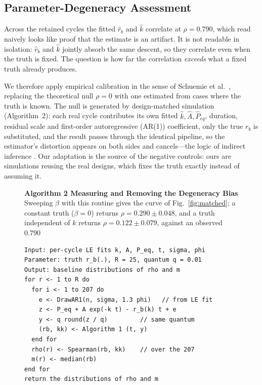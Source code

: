 \documentclass[sigconf]{acmart}
\newcommand{\rb}{\ensuremath{r_{b}}}
\newcommand{\rbh}{\ensuremath{\hat{r}_{b}}}
\newcommand{\kh}{\ensuremath{\hat{k}}}
\begin{document}
\subsection{Parameter-Degeneracy Assessment}

Across the retained cycles the fitted \rbh{} and \kh{} correlate at
$\rho=0.790$, which read naively looks like proof that the estimate is
an artifact. It is not readable in isolation: \rbh{} and \kh{} jointly
absorb the same descent, so they correlate even when the truth is
fixed. The question is how far the correlation \emph{exceeds} what a
fixed truth already produces.

We therefore apply empirical calibration in the sense of Schuemie et
al.~\cite{schuemie2014interpreting}, replacing the theoretical null
$\rho=0$ with one estimated from cases where the truth is known. The
null is generated by design-matched simulation (Algorithm~2): each real
cycle contributes its own fitted $\kh,\hat{A},\hat{P}_{eq}$, duration,
residual scale and first-order autoregressive
(AR(1)) coefficient, only the true \rb{} is
substituted, and the result passes through the identical pipeline, so
the estimator's distortion appears on both sides and cancels---the
logic of indirect inference \cite{gourieroux1993indirect}. Our adaptation is the source of the negative controls: ours are
simulations reusing the real designs, which fixes the truth exactly
instead of assuming it.

\begin{figure}[t]
\noindent\textbf{Algorithm 2  Measuring and Removing the Degeneracy Bias} Sweeping
$\beta$ with this routine gives the curve of Fig.~\ref{fig:matched};
a constant truth ($\beta=0$) returns $\rho=0.290\pm0.048$, and a truth
independent of $k$ returns $\rho=0.122\pm0.079$, against an observed
$0.790$

\begin{verbatim}
Input: per-cycle LE fits k, A, P_eq, t, sigma, phi
Parameter: truth r_b(.), R = 25, quantum q = 0.01
Output: baseline distributions of rho and m
for r <- 1 to R do
  for i <- 1 to 207 do
    e <- DrawAR1(n, sigma, 1.3 phi)   // from LE fit
    z <- P_eq + A exp(-k t) - r_b(k) t + e
    y <- q round(z / q)         // same quantum
    (rb, kk) <- Algorithm 1 (t, y)
  end for
  rho(r) <- Spearman(rb, kk)    // over the 207
  m(r) <- median(rb)
end for
return the distributions of rho and m
\end{verbatim}

\end{figure}
\end{document}
